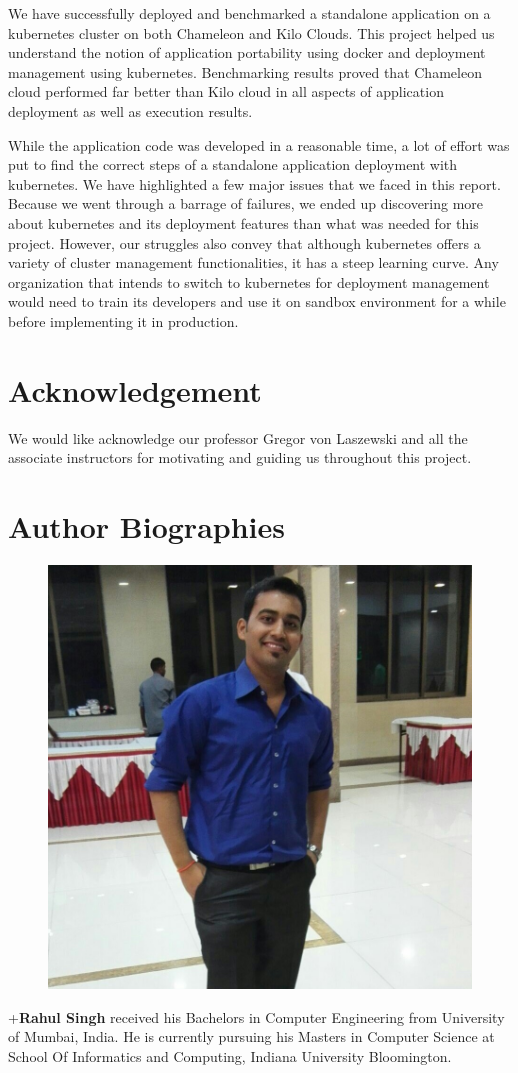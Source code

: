 \documentclass[9pt,twocolumn,twoside]{../../styles/osajnl}
\begin{document}
We have successfully deployed and benchmarked a standalone application
on a kubernetes cluster on both Chameleon and Kilo Clouds. This
project helped us understand the notion of application portability
using docker and deployment management using kubernetes. Benchmarking
results proved that Chameleon cloud performed far better than Kilo
cloud in all aspects of application deployment as well as execution
results.

\noindent
While the application code was developed in a reasonable time, a lot
of effort was put to find the correct steps of a standalone
application deployment with kubernetes. We have highlighted a few
major issues that we faced in this report. Because we went through a
barrage of failures, we ended up discovering more about kubernetes and
its deployment features than what was needed for this
project. However, our struggles also convey that although kubernetes
offers a variety of cluster management functionalities, it has a steep
learning curve. Any organization that intends to switch to kubernetes
for deployment management would need to train its developers and use
it on sandbox environment for a while before implementing it in
production.

\section{Acknowledgement}

We would like acknowledge our professor Gregor von Laszewski and all
the associate instructors for motivating and guiding us throughout
this project.


 

\section*{Author Biographies}
\begingroup
\setlength\intextsep{0pt}
\begin{minipage}[t][3.2cm][t]{1.0\columnwidth} %
  \begin{figure}
    \includegraphics[width=0.25\columnwidth]{images/rahul_singh.jpg}
  \end{figure}
  \noindent
+{\bfseries Rahul Singh} received his Bachelors in Computer
Engineering from University of Mumbai, India. He is currently pursuing
his Masters in Computer Science at School Of Informatics and
Computing, Indiana University Bloomington.

\end{minipage}
\endgroup
\end{document}
